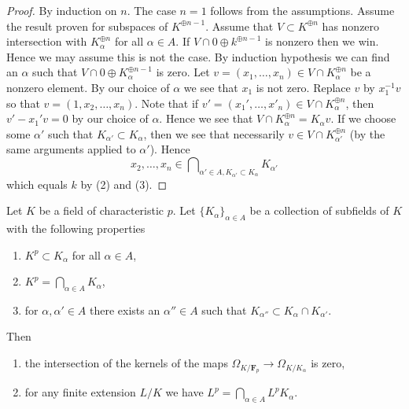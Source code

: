 \begin{proof}
By induction on $n$. The case $n = 1$ follows from the assumptions.
Assume the result proven for subspaces of $K^{\oplus n - 1}$.
Assume that $V \subset K^{\oplus n}$ has nonzero intersection with
$K_\alpha^{\oplus n}$ for all $\alpha \in A$. If
$V \cap 0 \oplus k^{\oplus n - 1}$ is nonzero then we win. Hence we may
assume this is not the case. By induction hypothesis we can find
an $\alpha$ such that $V \cap 0 \oplus K_\alpha^{\oplus n - 1}$
is zero. Let $v = (x_1, \ldots, x_n) \in V \cap K_\alpha^{\oplus n}$
be a nonzero element.
By our choice of $\alpha$ we see that $x_1$ is not zero.
Replace $v$ by $x_1^{-1}v$ so that $v = (1, x_2, \ldots, x_n)$.
Note that if $v' = (x_1', \ldots, x'_n) \in V \cap K_\alpha^{\oplus n}$, then
$v' - x_1'v = 0$ by our choice of $\alpha$. Hence we see that
$V \cap K_\alpha^{\oplus n} = K_\alpha v$. If we choose some
$\alpha'$ such that $K_{\alpha'} \subset K_\alpha$, then we
see that necessarily $v \in V \cap K_{\alpha'}^{\oplus n}$ (by the
same arguments applied to $\alpha'$). Hence
$$
x_2, \ldots, x_n \in
\bigcap\nolimits_{\alpha' \in A, K_{\alpha'} \subset K_\alpha} K_{\alpha'}
$$
which equals $k$ by (2) and (3).
\end{proof}

\begin{lemma}
\label{lemma-intersection-subfields}
Let $K$ be a field of characteristic $p$. Let $\{K_\alpha\}_{\alpha \in A}$
be a collection of subfields of $K$ with the following properties
\begin{enumerate}
\item $K^p \subset K_\alpha$ for all $\alpha \in A$,
\item $K^p = \bigcap_{\alpha \in A} K_\alpha$,
\item for $\alpha, \alpha' \in A$ there exists an $\alpha'' \in A$
such that $K_{\alpha''} \subset K_\alpha \cap K_{\alpha'}$.
\end{enumerate}
Then
\begin{enumerate}
\item the intersection of the kernels of the maps
$\Omega_{K/\mathbf{F}_p} \to \Omega_{K/K_\alpha}$ is zero,
\item for any finite extension $L/K$ we have
$L^p = \bigcap_{\alpha \in A} L^pK_\alpha$.
\end{enumerate}
\end{lemma}

